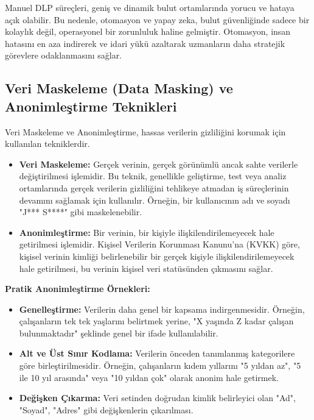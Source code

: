 Manuel DLP süreçleri, geniş ve dinamik bulut ortamlarında yorucu ve hataya açık olabilir. Bu nedenle, otomasyon ve yapay zeka, bulut güvenliğinde sadece bir kolaylık değil, operasyonel bir zorunluluk haline gelmiştir. Otomasyon, insan hatasını en aza indirerek ve idari yükü azaltarak uzmanların daha stratejik görevlere odaklanmasını sağlar.

\subsection{Veri Maskeleme (Data Masking) ve Anonimleştirme Teknikleri}

Veri Maskeleme ve Anonimleştirme, hassas verilerin gizliliğini korumak için kullanılan tekniklerdir.

\begin{itemize}
    \item \textbf{Veri Maskeleme:} Gerçek verinin, gerçek görünümlü ancak sahte verilerle değiştirilmesi işlemidir. Bu teknik, genellikle geliştirme, test veya analiz ortamlarında gerçek verilerin gizliliğini tehlikeye atmadan iş süreçlerinin devamını sağlamak için kullanılır. Örneğin, bir kullanıcının adı ve soyadı "J*** S****" gibi maskelenebilir.
    \item \textbf{Anonimleştirme:} Bir verinin, bir kişiyle ilişkilendirilemeyecek hale getirilmesi işlemidir. Kişisel Verilerin Korunması Kanunu'na (KVKK) göre, kişisel verinin kimliği belirlenebilir bir gerçek kişiyle ilişkilendirilemeyecek hale getirilmesi, bu verinin kişisel veri statüsünden çıkmasını sağlar.
\end{itemize}

\textbf{Pratik Anonimleştirme Örnekleri:}

\begin{itemize}
    \item \textbf{Genelleştirme:} Verilerin daha genel bir kapsama indirgenmesidir. Örneğin, çalışanların tek tek yaşlarını belirtmek yerine, "X yaşında Z kadar çalışan bulunmaktadır" şeklinde genel bir ifade kullanılabilir.
    \item \textbf{Alt ve Üst Sınır Kodlama:} Verilerin önceden tanımlanmış kategorilere göre birleştirilmesidir. Örneğin, çalışanların kıdem yıllarını "5 yıldan az", "5 ile 10 yıl arasında" veya "10 yıldan çok" olarak anonim hale getirmek.
    \item \textbf{Değişken Çıkarma:} Veri setinden doğrudan kimlik belirleyici olan "Ad", "Soyad", "Adres" gibi değişkenlerin çıkarılması.
\end{itemize}

